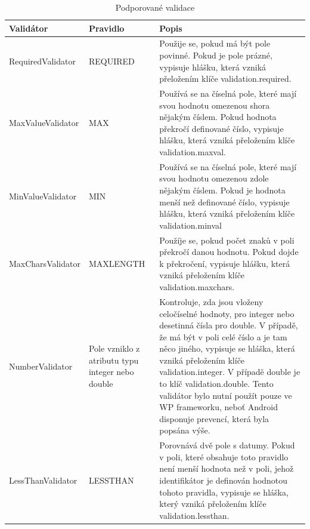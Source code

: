 \begin{table}[h!]
\begin{center}
\caption{Podporované validace}
\label{table:validations}
\begin{tabular}{|p{3.5cm}|p{4.5cm}|p{7cm}|}
\hline
\textbf{Validátor} & \textbf{Pravidlo} & \textbf{Popis} \\
\hline
RequiredValidator & 
REQUIRED & Použije se, pokud má být pole povinné. Pokud je pole prázné, vypisuje hlášku, která vzniká přeložením klíče validation.required. \\
\hline
MaxValueValidator &
MAX & Používá se na číselná pole, které mají svou hodnotu omezenou shora nějakým číslem. Pokud hodnota překročí definované číslo, vypisuje hlášku, která vzniká přeložením klíče validation.maxval. \\
\hline
MinValueValidator & MIN &
Používá se na číselná pole, které mají svou hodnotu omezenou zdole nějakým číslem. Pokud je hodnota menší než definované číslo, vypisuje hlášku, která vzniká přeložením klíče validation.minval \\
\hline
MaxCharsValidator & MAXLENGTH &
Použíje se, pokud počet znaků v poli překročí danou hodnotu. Pokud dojde k překročení, vypisuje hlášku, která vzniká přeložením klíče validation.maxchars.\\
\hline
NumberValidator & Pole vzniklo z atributu typu integer nebo double &
Kontroluje, zda jsou vloženy celočíselné hodnoty, pro integer nebo desetinná čísla pro double. V případě, že má být v poli celé číslo a je tam něco jiného, vypisuje se hláška, která vzniká přeložením klíče validation.integer. V případě double je to klíč validation.double. 
Tento validátor bylo nutní použít pouze ve WP frameworku, neboť Android disponuje prevencí, která byla popsána výše.\\
\hline
LessThanValidator & LESSTHAN &
Porovnává dvě pole s datumy. Pokud v poli, které obsahuje toto pravidlo není menší hodnota než v poli, jehož identifikátor je definován hodnotou tohoto pravidla, vypisuje se hláška, který vzniká přeložením klíče validation.lessthan.  \\
\hline
\end{tabular}
\end{center}
\end{table}

